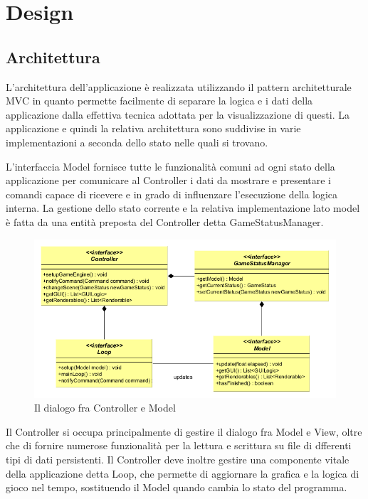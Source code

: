 \documentclass[a4paper,12pt, hidelinks]{report}
\begin{document}
\chapter{Design}

\section{Architettura}

L'architettura dell'applicazione è realizzata utilizzando il pattern architetturale MVC in quanto permette facilmente di separare la logica e i dati della applicazione dalla effettiva tecnica adottata per la visualizzazione di questi. La applicazione e quindi la relativa architettura sono suddivise in varie implementazioni a seconda dello stato nelle quali si trovano.

L'interfaccia Model fornisce tutte le funzionalità comuni ad ogni stato della applicazione per comunicare al Controller i dati da mostrare e presentare i comandi capace di ricevere e in grado di influenzare l'esecuzione della logica interna. La gestione dello stato corrente e la relativa implementazione lato model è fatta da una entità preposta del Controller detta GameStatusManager.

\begin{figure}[H]
\centering{}
\includegraphics[width=\linewidth]{img/ArchitetturaControllerModel}
\caption{Il dialogo fra Controller e Model}
\label{img:ControllerModel}
\end{figure}

Il Controller si occupa principalmente di gestire il dialogo fra Model e View, oltre che di fornire numerose funzionalità per la lettura e scrittura su file di dfferenti tipi di dati persistenti. Il Controller deve inoltre gestire una componente vitale della applicazione detta Loop, che permette di aggiornare la grafica e la logica di gioco nel tempo, sostituendo il Model quando cambia lo stato del programma.
\end{document}
